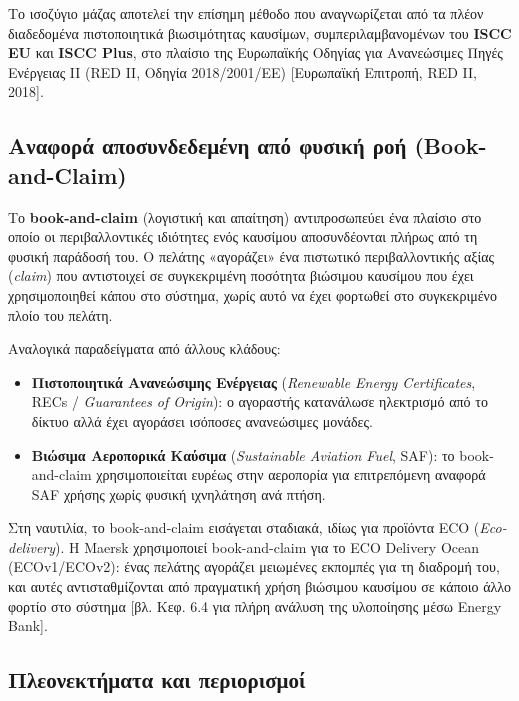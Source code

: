 \documentclass[11pt,a4paper,greek,twoside]{template-xe}
\providecommand{\tightlist}{\setlength{\itemsep}{0pt}\setlength{\parskip}{0pt}}
\begin{document}
Το ισοζύγιο μάζας αποτελεί την επίσημη μέθοδο που αναγνωρίζεται από τα
πλέον διαδεδομένα πιστοποιητικά βιωσιμότητας καυσίμων,
συμπεριλαμβανομένων του \textbf{ISCC EU} και \textbf{ISCC Plus}, στο
πλαίσιο της Ευρωπαϊκής Οδηγίας για Ανανεώσιμες Πηγές Ενέργειας II (RED
II, Οδηγία 2018/2001/ΕΕ) {[}Ευρωπαϊκή Επιτροπή, RED II, 2018{]}.

\subsection{Αναφορά αποσυνδεδεμένη από φυσική ροή
(Book-and-Claim)}\label{ux3b1ux3bdux3b1ux3c6ux3bfux3c1ux3ac-ux3b1ux3c0ux3bfux3c3ux3c5ux3bdux3b4ux3b5ux3b4ux3b5ux3bcux3adux3bdux3b7-ux3b1ux3c0ux3cc-ux3c6ux3c5ux3c3ux3b9ux3baux3ae-ux3c1ux3bfux3ae-book-and-claim}

Το \textbf{book-and-claim} (λογιστική και απαίτηση) αντιπροσωπεύει ένα
πλαίσιο στο οποίο οι περιβαλλοντικές ιδιότητες ενός καυσίμου
αποσυνδέονται πλήρως από τη φυσική παράδοσή του. Ο πελάτης «αγοράζει»
ένα πιστωτικό περιβαλλοντικής αξίας (\emph{claim}) που αντιστοιχεί σε
συγκεκριμένη ποσότητα βιώσιμου καυσίμου που έχει χρησιμοποιηθεί κάπου
στο σύστημα, χωρίς αυτό να έχει φορτωθεί στο συγκεκριμένο πλοίο του
πελάτη.

Αναλογικά παραδείγματα από άλλους κλάδους:

\begin{itemize}
\tightlist
\item
  \textbf{Πιστοποιητικά Ανανεώσιμης Ενέργειας} (\emph{Renewable Energy
  Certificates}, RECs / \emph{Guarantees of Origin}): ο αγοραστής
  κατανάλωσε ηλεκτρισμό από το δίκτυο αλλά έχει αγοράσει ισόποσες
  ανανεώσιμες μονάδες.
\item
  \textbf{Βιώσιμα Αεροπορικά Καύσιμα} (\emph{Sustainable Aviation Fuel},
  SAF): το book-and-claim χρησιμοποιείται ευρέως στην αεροπορία για
  επιτρεπόμενη αναφορά SAF χρήσης χωρίς φυσική ιχνηλάτηση ανά πτήση.
\end{itemize}

Στη ναυτιλία, το book-and-claim εισάγεται σταδιακά, ιδίως για προϊόντα
ECO (\emph{Eco-delivery}). Η Maersk χρησιμοποιεί book-and-claim για το
ECO Delivery Ocean (ECOv1/ECOv2): ένας πελάτης αγοράζει μειωμένες
εκπομπές για τη διαδρομή του, και αυτές αντισταθμίζονται από πραγματική
χρήση βιώσιμου καυσίμου σε κάποιο άλλο φορτίο στο σύστημα {[}βλ. Κεφ.
6.4 για πλήρη ανάλυση της υλοποίησης μέσω Energy Bank{]}.

\subsection{Πλεονεκτήματα και
περιορισμοί}\label{ux3c0ux3bbux3b5ux3bfux3bdux3b5ux3baux3c4ux3aeux3bcux3b1ux3c4ux3b1-ux3baux3b1ux3b9-ux3c0ux3b5ux3c1ux3b9ux3bfux3c1ux3b9ux3c3ux3bcux3bfux3af}
\end{document}

